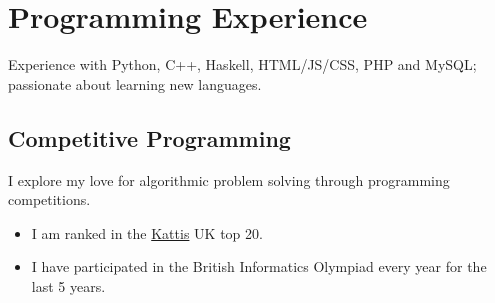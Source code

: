 \documentclass{Resume}
\begin{document}
	\section{Programming Experience}
			Experience with Python, C++, Haskell, HTML/JS/CSS, PHP and MySQL; passionate about learning new languages.

		\subsection{Competitive Programming}
			I explore my love for algorithmic problem solving through programming competitions. 
			\begin{itemize}
			    \item I am ranked in the \href{https://open.kattis.com/countries/GBR}{Kattis} UK top 20.
			    \item I have participated in the British Informatics Olympiad every year for the last 5 years.
			    
			\end{itemize}
\end{document}
